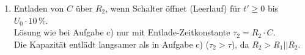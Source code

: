 {\begin{enumerate}
\begin{align*}
    u_C(t') = U_0 \cdot \mathrm{e}^{-\frac{t'}{\tau}} &\overset{!}{=} U_0 \cdot 10\,\% \\
    \mathrm{e}^{-\frac{t'}{\tau}} &= \frac{1}{10} \\
    -\frac{t'}{\tau} &= \ln\left(\frac{1}{10}\right) = -\ln\left(10\right) \\
    t' &= \ln\left(10\right) \cdot \tau \approx 2,3025 \cdot \tau
\end{align*}
\item[d)] Entladen von $C$ über $R_2$, wenn Schalter öffnet (Leerlauf) für $t'\geq0$ bis $U_0 \cdot 10\,\%$.\\
Lösung wie bei Aufgabe c) nur mit Entlade-Zeitkonstante $\tau_2 = R_2 \cdot C$. \\
Die Kapazität entlädt langsamer als in Aufgabe c) ($\tau_2 > \tau$), da $R_2 > R_1||R_2$.
\end{enumerate}
}


